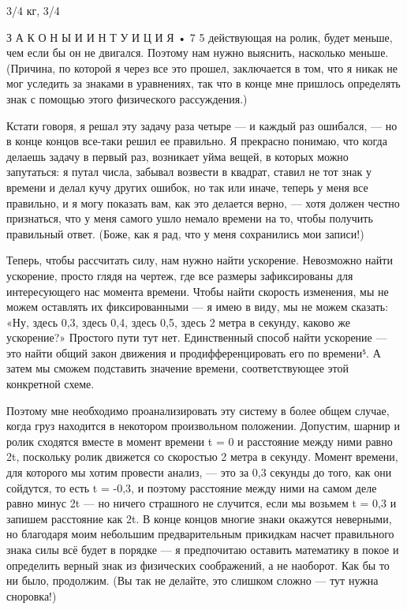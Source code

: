 \documentclass[10pt,oneside]{article}
\begin{document}
3/4 кг, 3/4\par

З А К О Н Ы  И  И Н Т У И Ц И Я • 7 5 действующая на ролик, будет меньше, чем если бы он не двигался. Поэтому нам нужно выяснить, насколько меньше. (Причина, по которой я через все это прошел, заключается в том, что я никак не мог уследить за знаками в уравнениях, так что в конце мне пришлось определять знак с помощью этого физического рассуждения.)\par

Кстати говоря, я решал эту задачу раза четыре --- и каждый раз ошибался, --- но в конце концов все-таки решил ее правильно. Я прекрасно понимаю, что когда делаешь задачу в первый раз, возникает уйма вещей, в которых можно запутаться: я путал числа, забывал возвести в квадрат, ставил не тот знак у времени и делал кучу других ошибок, но так или иначе, теперь у меня все правильно, и я могу показать вам, как это делается верно, --- хотя должен честно признаться, что у меня самого ушло немало времени на то, чтобы получить правильный ответ. (Боже, как я рад, что у меня сохранились мои записи!)\par

Теперь, чтобы рассчитать силу, нам нужно найти ускорение. Невозможно найти ускорение, просто глядя на чертеж, где все размеры зафиксированы для интересующего нас момента времени. Чтобы найти скорость изменения, мы не можем оставлять их фиксированными --- я имею в виду, мы не можем сказать: «Ну, здесь 0,3, здесь 0,4, здесь 0,5, здесь 2 метра в секунду, каково же ускорение?» Простого пути тут нет. Единственный способ найти ускорение --- это найти общий закон движения и продифференцировать его по времени⁵. А затем мы сможем подставить значение времени, соответствующее этой конкретной схеме.\par

Поэтому мне необходимо проанализировать эту систему в более общем случае, когда груз находится в некотором произвольном положении. Допустим, шарнир и ролик сходятся вместе в момент времени t = 0 и расстояние между ними равно 2t, поскольку ролик движется со скоростью 2 метра в секунду. Момент времени, для которого мы хотим провести анализ, --- это за 0,3 секунды до того, как они сойдутся, то есть t = -0,3, и поэтому расстояние между ними на самом деле равно минус 2t --- но ничего страшного не случится, если мы возьмем t = 0,3 и запишем расстояние как 2t. В конце концов многие знаки окажутся неверными, но благодаря моим небольшим предварительным прикидкам насчет правильного знака силы всё будет в порядке --- я предпочитаю оставить математику в покое и определить верный знак из физических соображений, а не наоборот. Как бы то ни было, продолжим. (Вы так не делайте, это слишком сложно --- тут нужна сноровка!)\par
\end{document}
